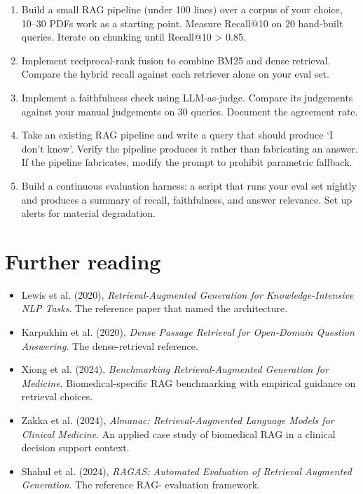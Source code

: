 \documentclass[
  letterpaper,
  11pt]{scrbook}
\providecommand{\tightlist}{%
  \setlength{\itemsep}{0pt}\setlength{\parskip}{0pt}}
\begin{document}
\begin{enumerate}
\def\labelenumi{\arabic{enumi}.}
\item
  Build a small RAG pipeline (under 100 lines) over a corpus of your
  choice, 10--30 PDFs work as a starting point. Measure Recall@10 on 20
  hand-built queries. Iterate on chunking until Recall@10 \textgreater{}
  0.85.
\item
  Implement reciprocal-rank fusion to combine BM25 and dense retrieval.
  Compare the hybrid recall against each retriever alone on your eval
  set.
\item
  Implement a faithfulness check using LLM-as-judge. Compare its
  judgements against your manual judgements on 30 queries. Document the
  agreement rate.
\item
  Take an existing RAG pipeline and write a query that should produce `I
  don't know'. Verify the pipeline produces it rather than fabricating
  an answer. If the pipeline fabricates, modify the prompt to prohibit
  parametric fallback.
\item
  Build a continuous evaluation harness: a script that runs your eval
  set nightly and produces a summary of recall, faithfulness, and answer
  relevance. Set up alerts for material degradation.
\end{enumerate}

\section{Further reading}\label{further-reading-4}

\begin{itemize}
\tightlist
\item
  Lewis et al. (2020), \emph{Retrieval-Augmented Generation for
  Knowledge-Intensive NLP Tasks}. The reference paper that named the
  architecture.
\item
  Karpukhin et al. (2020), \emph{Dense Passage Retrieval for Open-Domain
  Question Answering}. The dense-retrieval reference.
\item
  Xiong et al. (2024), \emph{Benchmarking Retrieval-Augmented Generation
  for Medicine}. Biomedical-specific RAG benchmarking with empirical
  guidance on retrieval choices.
\item
  {Zakka et al.} (2024), \emph{Almanac: Retrieval-Augmented Language
  Models for Clinical Medicine}. An applied case study of biomedical RAG
  in a clinical decision support context.
\item
  Shahul et al. (2024), \emph{RAGAS: Automated Evaluation of Retrieval
  Augmented Generation}. The reference RAG- evaluation framework.
\end{itemize}
\end{document}
